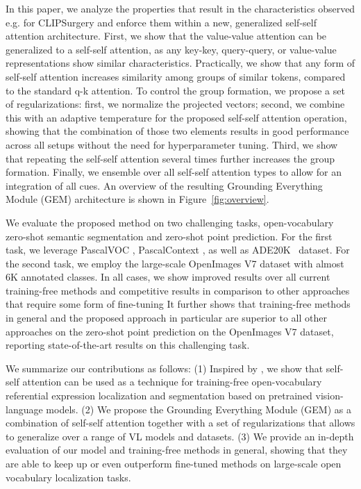 \documentclass[10pt,twocolumn,letterpaper]{article}
\begin{document}
In this paper, we analyze the properties that result in the characteristics observed e.g. for CLIPSurgery and enforce them within a new, generalized self-self attention architecture. 
First, we show that the value-value attention can be generalized to a self-self attention, as any key-key, query-query, or value-value representations show similar characteristics.
Practically, we show that any form of self-self attention increases similarity among groups of similar tokens, compared to the standard q-k attention. 
To control the group formation, we propose a set of regularizations: first, we  normalize the projected vectors; second, we combine this with an adaptive temperature  for the proposed self-self attention operation, showing that the combination of those two elements results in good performance across all setups without the need for hyperparameter tuning.
Third, we show that repeating the self-self attention several times further increases the group formation. Finally, we ensemble over all self-self attention types to allow for an integration of all cues. 
An overview of the resulting Grounding Everything Module (GEM) architecture is shown in Figure~\ref{fig:overview}.


We evaluate the proposed method on two challenging tasks, open-vocabulary zero-shot semantic segmentation and zero-shot point prediction. For the first task, we leverage PascalVOC \citep{everingham2010pascal}, PascalContext \citep{mottaghi2014role}, as well as ADE20K~\citep{zhou2019sADE} dataset. For the second task, we employ the large-scale OpenImages V7 \citep{benenson2022colouring} dataset with almost 6K annotated classes. In all cases, we show improved results over all current training-free methods \citep{li2023clipsurgery, zhou2022extract} and competitive results in comparison to other approaches that require some form of fine-tuning \citep{xu2022groupvit, xu2023learning, luo2023segclip} 
It further shows that training-free methods in general and the proposed approach in particular are superior to all other approaches on the zero-shot point prediction on the OpenImages V7 dataset, reporting state-of-the-art results on this challenging task.

We summarize our contributions as follows:
(1) Inspired by \citet{li2023clipsurgery}, we show that self-self attention can be used as a technique for training-free open-vocabulary referential expression localization and segmentation based on pretrained vision-language models. 
(2) We propose the Grounding Everything Module (GEM) as a combination of self-self attention together with a set of regularizations that allows to generalize over a range of VL models and datasets.
(3) We provide an in-depth evaluation of our model and training-free methods in general, showing that they are able to keep up or even outperform fine-tuned methods on large-scale open vocabulary localization tasks.
 
\end{document}
